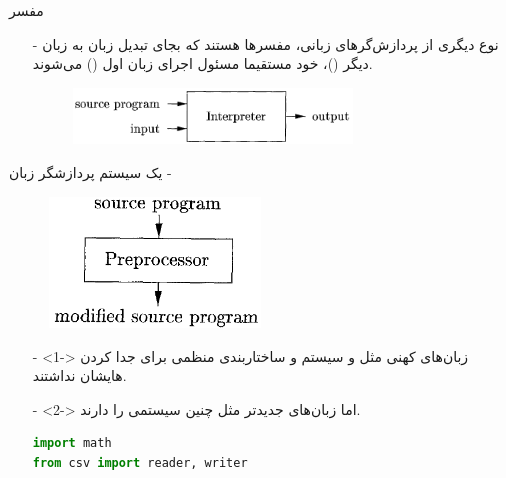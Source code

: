 \begin{frame}{مفسر}
\begin{itemize}\itemr
\item[-]
نوع دیگری از پردازش‌گر‌های زبانی، مفسرها هستند که بجای تبدیل زبان به زبان دیگر ()، خود مستقیما مسئول اجرای زبان اول () می‌شوند.
\vspace{5mm}
\begin{figure}[H]
\begin{center}
\includegraphics[width=0.7\textwidth, height=0.3\textheight, angle=0]{docs/images/interpreter}
\end{center}
\end{figure}
\end{itemize}
\end{frame}

\begin{frame}{یک سیستم پردازشگر زبان - }
\begin{figure}[H]
\begin{center}
\includegraphics[width=0.5\textwidth, height=0.5\textheight, angle=0.6]{docs/images/preprocessor}
\end{center}
\end{figure}
\end{frame}

\begin{frame}[fragile]{}
\begin{itemize}\itemr
\item[-]<1->
زبان‌های کهنی مثل  و  سیستم  و ساختاربندی منظمی برای جدا کردن هایشان نداشتند.

\item[-]<2->
اما زبان‌های جدیدتر مثل  چنین سیستمی را دارند.

\begin{latin}
\begin{lstlisting}[language=python]
import math
from csv import reader, writer
\end{lstlisting}
\end{latin}
\end{itemize}
\end{frame}

